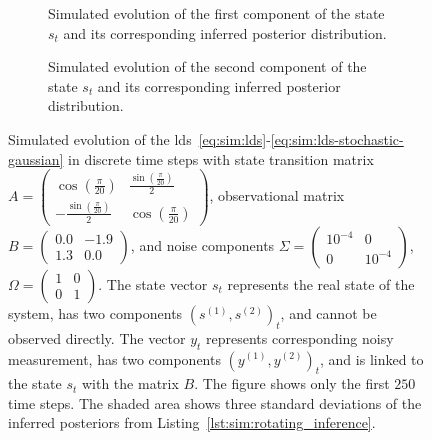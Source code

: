 \begin{figure}
  \centering
  \begin{subfigure}[t]{0.475\textwidth}
    \centering
    \caption{Simulated evolution of the first component of the state $s_t$ and its corresponding inferred posterior distribution.}
    \label{fig:sim:rotating_example_inference_states_1}
  \end{subfigure}
  \hfill
  \begin{subfigure}[t]{0.475\textwidth}
    \centering
    \caption{Simulated evolution of the second component of the state $s_t$ and its corresponding inferred posterior distribution.}
    \label{fig:sim:rotating_example_inference_states_2}
  \end{subfigure}
  \caption{
    Simulated evolution of the \ac{lds}~\eqref{eq:sim:lds}-\eqref{eq:sim:lds-stochastic-gaussian} in discrete time steps with state transition matrix $A =
      \begin{pmatrix}
        \cos(\frac{\pi}{20}) & \frac{\sin(\frac{\pi}{20})}{2} \\ -\frac{\sin(\frac{\pi}{20})}{2} & \cos(\frac{\pi}{20})
      \end{pmatrix}
    $, observational matrix $B =
      \begin{pmatrix}
        0.0 & -1.9 \\ 1.3 & 0.0
      \end{pmatrix}
    $, and noise components $\Sigma =
      \begin{pmatrix}
        10^{-4} & 0 \\ 0 & 10^{-4}
      \end{pmatrix}
    $, $\Omega =
      \begin{pmatrix}
        1 & 0 \\ 0 & 1
      \end{pmatrix}
    $.
    The state vector $s_t$ represents the real state of the system, has two components $(s^{(1)},
      s^{(2)})_t$, and cannot be observed directly.
    The vector $y_t$ represents corresponding noisy measurement, has two components $(y^{(1)},
      y^{(2)})_t$, and is linked to the state $s_t$ with the matrix $B$.
    The figure shows only the first $250$ time steps.
    The shaded area shows three standard deviations of the inferred posteriors from
    Listing~\ref{lst:sim:rotating_inference}.
  }
  \label{fig:sim:rotating_example_inference_states}
\end{figure}

